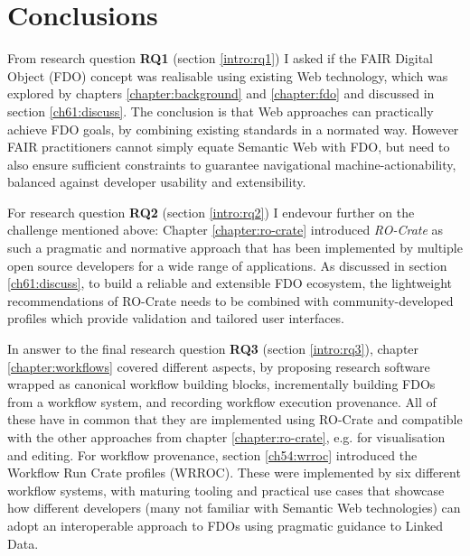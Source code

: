 \section{Conclusions}


From research question \textbf{RQ1} (section \vref{intro:rq1}) I asked if the FAIR Digital Object (FDO) concept was realisable using existing Web technology, which was explored by chapters \ref{chapter:background} and \ref{chapter:fdo} and discussed in section \ref{ch61:discuss}. The conclusion is that Web approaches can practically achieve FDO goals, by combining existing standards in a normated way. However FAIR practitioners cannot simply equate Semantic Web with FDO, but need to also ensure sufficient constraints to guarantee navigational machine-actionability, balanced against developer usability and extensibility. 

For research question \textbf{RQ2} (section \vref{intro:rq2}) I endevour further on the challenge mentioned above: Chapter \ref{chapter:ro-crate} introduced \emph{RO-Crate} as such a pragmatic and normative approach that has been implemented by multiple open source developers for a wide range of applications. As discussed in section \ref{ch61:discuss}, to build a reliable and extensible FDO ecosystem, the lightweight recommendations of RO-Crate needs to be combined with community-developed profiles which provide validation and tailored user interfaces.

In answer to the final research question \textbf{RQ3} (section \vref{intro:rq3}), chapter \ref{chapter:workflows} covered different aspects, by proposing research software wrapped as canonical workflow building blocks, incrementally building FDOs from a workflow system, and recording workflow execution provenance. All of these have in common that they are implemented using RO-Crate and compatible with the other approaches from chapter \ref{chapter:ro-crate}, e.g. for visualisation and editing. For workflow provenance, section \vref{ch54:wrroc} introduced the Workflow Run Crate profiles (WRROC). These were implemented by six different workflow systems, with maturing tooling and practical use cases that showcase how different developers (many not familiar with Semantic Web technologies) can adopt an interoperable approach to FDOs using pragmatic guidance to Linked Data.


